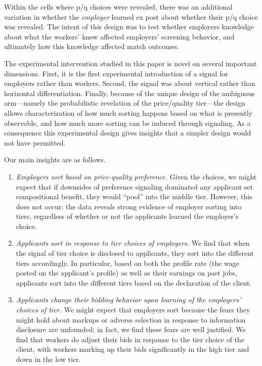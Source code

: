 \documentclass[prodmode,acmec]{ec-acmsmall}
\begin{document}
Within the cells where p/q choices were revealed, there was an additional variation in whether the {\em employer} learned ex post about whether their p/q choice was revealed.
The intent of this design was to test whether employers knowledge about what the workers' knew affected employers' screening behavior, and ultimately how this knowledge affected match outcomes.

The experimental intervention studied in this paper is novel on several important dimensions.
First, it is the first experimental introduction of a signal for employers rather than workers. 
Second, the signal was about vertical rather than horizontal differentiation. 
Finally, because of the unique design of the ambiguous arm---namely the probabilistic revelation of the price/quality tier---the design allows characterization of how much sorting happens based on what is presently observable, and how much more sorting can be induced through signaling.
As a consequence this experimental design gives insights that a simpler design would not have permitted. 

Our main insights are as follows.
\begin{enumerate}
\item {\em Employers sort based on price-quality preference.}
Given the choices, we might expect that if downsides of preference signaling dominated any applicant set compositional benefit, they would ``pool'' into the middle tier.
However, this does not occur:
the data reveals strong evidence of employer sorting into tiers, regardless of whether or not the applicants learned the employer's choice.
\item {\em Applicants sort in response to tier choices of employers.}
We find that when the signal of tier choice is disclosed to applicants, they sort into the different tiers accordingly.
In particular, based on both the profile rate (the wage posted on the applicant's profile) as well as their earnings on past jobs, applicants sort into the different tiers based on the declaration of the client.
\item {\em Applicants change their bidding behavior upon learning of the employers' choices of tier.}
We might expect that employers sort because the fears they might hold about markups or adverse selection in response to information disclosure are unfounded; in fact, we find these fears are well justified.  We find that workers do adjust their bids in response to the tier choice of the client, with workers marking up their bids significantly in the high tier and down in the low tier.  
\end{enumerate}
\end{document}
